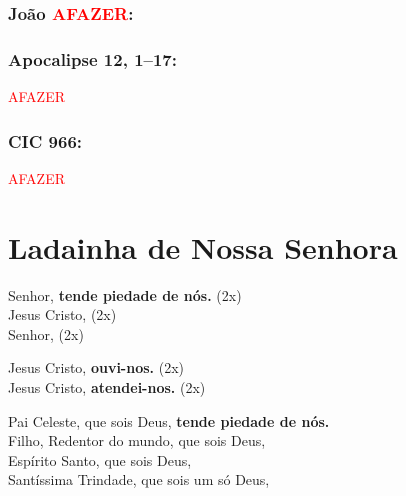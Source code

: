 \documentclass[10pt,a5paper]{book}
\newcommand{\from}[1]{\subsection*{#1}}
\newcommand{\TODO}{\textcolor{red}{\ttfamily AFAZER}}
\begin{document}
\from{João \TODO:}

\from{Apocalipse 12, 1--17:}

\TODO

\from{CIC 966:}

\TODO


\chapter{Ladainha de Nossa Senhora}

Senhor, \textbf{tende piedade de nós.} (2x) \\
Jesus Cristo, (2x) \\
Senhor, (2x)

Jesus Cristo, \textbf{ouvi-nos.} (2x) \\
Jesus Cristo, \textbf{atendei-nos.} (2x)

Pai Celeste, que sois Deus, \textbf{tende piedade de nós.} \\
Filho, Redentor do mundo, que sois Deus, \\
Espírito Santo, que sois Deus, \\
Santíssima Trindade, que sois um só Deus,
\end{document}
